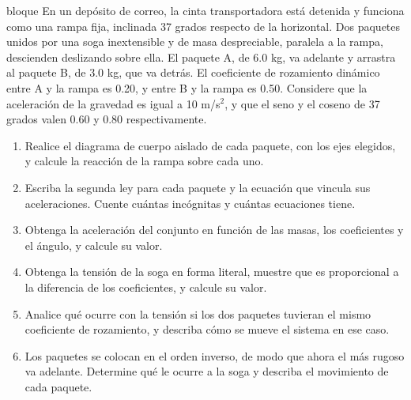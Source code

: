 \documentclass[11pt,openany]{book}
\begin{document}
\begin{ejercicio}{bloque}
En un depósito de correo, la cinta transportadora está detenida y funciona como una rampa fija, inclinada 37 grados respecto de la horizontal. Dos paquetes unidos por una soga inextensible y de masa despreciable, paralela a la rampa, descienden deslizando sobre ella. El paquete A, de 6.0 kg, va adelante y arrastra al paquete B, de 3.0 kg, que va detrás. El coeficiente de rozamiento dinámico entre A y la rampa es 0.20, y entre B y la rampa es 0.50. Considere que la aceleración de la gravedad es igual a 10 m/s$^2$, y que el seno y el coseno de 37 grados valen 0.60 y 0.80 respectivamente.
\begin{enumerate}[label=(\alph*), leftmargin=1.7em, itemsep=1pt, topsep=3pt]
  \item Realice el diagrama de cuerpo aislado de cada paquete, con los ejes elegidos, y calcule la reacción de la rampa sobre cada uno.
  \item Escriba la segunda ley para cada paquete y la ecuación que vincula sus aceleraciones. Cuente cuántas incógnitas y cuántas ecuaciones tiene.
  \item Obtenga la aceleración del conjunto en función de las masas, los coeficientes y el ángulo, y calcule su valor.
  \item Obtenga la tensión de la soga en forma literal, muestre que es proporcional a la diferencia de los coeficientes, y calcule su valor.
  \item Analice qué ocurre con la tensión si los dos paquetes tuvieran el mismo coeficiente de rozamiento, y describa cómo se mueve el sistema en ese caso.
  \item Los paquetes se colocan en el orden inverso, de modo que ahora el más rugoso va adelante. Determine qué le ocurre a la soga y describa el movimiento de cada paquete.
\end{enumerate}
\end{ejercicio}
\end{document}

